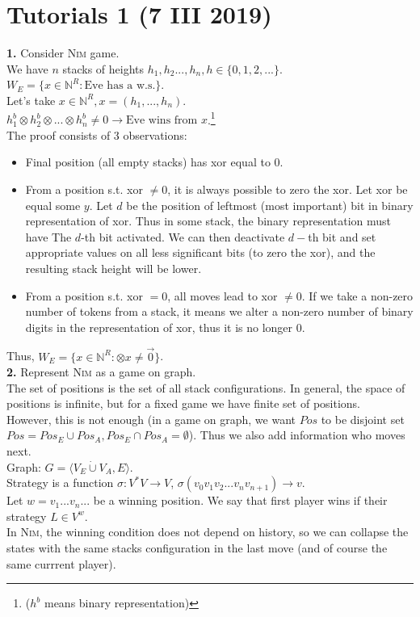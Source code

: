 \section{Tutorials 1 (7 III 2019)}
\noindent
\textbf{1.} Consider \textsc{Nim} game.\\
We have $n$ stacks of heights $h_1, h_2 ..., h_n, h \in \{0, 1, 2, ...\}$.\\
$W_E = \{x \in \mathbb{N}^R : \text{Eve has a w.s.}\}$.\\
Let's take $x \in \mathbb{N}^R, x = (h_1, ..., h_n)$.\\
$h_1^b \otimes h_2^b \otimes ... \otimes h_n^b \neq 0 \rightarrow \text{Eve wins from } x$.\footnote{($h^b$ means binary representation)}\\
The proof consists of 3 observations:
\begin{itemize}
	\item Final position (all empty stacks) has xor equal to 0.
	\item From a position s.t. xor $\neq 0$, it is always possible to zero the xor.
	Let xor be equal some $y$. Let $d$ be the position of leftmost (most important)
	bit in binary representation of xor. Thus in some stack, the binary representation
	must have The $d$-th bit activated. We can then deactivate $d-$th bit and set
	appropriate values on all less significant bits (to zero the xor), and the resulting
	stack height will be lower.
	\item From a position s.t. xor $= 0$, all moves lead to xor $\neq 0$. If we take
	a non-zero number of tokens from a stack, it means we alter a non-zero number of
	binary digits in the representation of xor, thus it is no longer 0.
\end{itemize}
Thus, $W_E = \{x \in \mathbb{N}^R : \otimes x \neq \vec{0}\}$.\\

\noindent
\textbf{2.} Represent \textsc{Nim} as a game on graph.\\
The set of positions is the set of all stack configurations. In general, the space of positions is infinite,
but for a fixed game we have finite set of positions.\\
However, this is not enough (in a game on graph, we want $Pos$ to be disjoint set $Pos = Pos_E \cup Pos_A, Pos_E \cap Pos_A = \emptyset$).
Thus we also add information who moves next.\\
Graph: $G = \langle V_E \dot\cup V_A, E \rangle$.\\
Strategy is a function $\sigma : V^*V \rightarrow V$, $\sigma(v_0v_1v_2...v_nv_{n+1}) \rightarrow v$.\\
Let $w = v_1...v_n...$ be a winning position. We say that first player wins if their strategy $L \in V^{w}$.\\
In \textsc{Nim}, the winning condition does not depend on history, so we can collapse the states with the same stacks configuration in the last move
(and of course the same currrent player).\\


